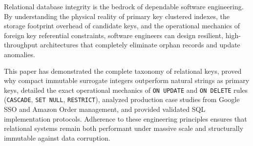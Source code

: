 \documentclass[10pt,journal,compsoc,onecolumn]{IEEEtran}
\begin{document}
Relational database integrity is the bedrock of dependable software engineering. By understanding the physical reality of primary key clustered indexes, the storage footprint overhead of candidate keys, and the operational mechanics of foreign key referential constraints, software engineers can design resilient, high-throughput architectures that completely eliminate orphan records and update anomalies. 

This paper has demonstrated the complete taxonomy of relational keys, proved why compact immutable surrogate integers outperform natural strings as primary keys, detailed the exact operational mechanics of \texttt{ON UPDATE} and \texttt{ON DELETE} rules (\texttt{CASCADE}, \texttt{SET NULL}, \texttt{RESTRICT}), analyzed production case studies from Google SSO and Amazon Order management, and provided validated SQL implementation protocols. Adherence to these engineering principles ensures that relational systems remain both performant under massive scale and structurally immutable against data corruption.

\end{document}

